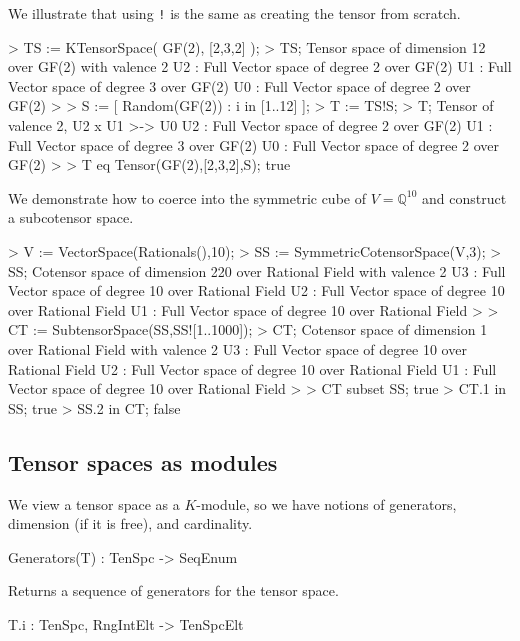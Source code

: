 \begin{example}[TenCoerce]
We illustrate that using {\tt !} is the same as creating the tensor from scratch.

\begin{code}
> TS := KTensorSpace( GF(2), [2,3,2] );
> TS;
Tensor space of dimension 12 over GF(2) with valence 2
U2 : Full Vector space of degree 2 over GF(2)
U1 : Full Vector space of degree 3 over GF(2)
U0 : Full Vector space of degree 2 over GF(2)
> 
> S := [ Random(GF(2)) : i in [1..12] ];
> T := TS!S;
> T;
Tensor of valence 2, U2 x U1 >-> U0
U2 : Full Vector space of degree 2 over GF(2)
U1 : Full Vector space of degree 3 over GF(2)
U0 : Full Vector space of degree 2 over GF(2)
> 
> T eq Tensor(GF(2),[2,3,2],S);
true
\end{code}

We demonstrate how to coerce into the symmetric cube of $V=\mathbb{Q}^{10}$ and construct a subcotensor space.

\begin{code}
> V := VectorSpace(Rationals(),10);
> SS := SymmetricCotensorSpace(V,3);
> SS;
Cotensor space of dimension 220 over Rational Field with valence 2
U3 : Full Vector space of degree 10 over Rational Field
U2 : Full Vector space of degree 10 over Rational Field
U1 : Full Vector space of degree 10 over Rational Field
> 
> CT := SubtensorSpace(SS,SS![1..1000]);
> CT;
Cotensor space of dimension 1 over Rational Field with valence 2
U3 : Full Vector space of degree 10 over Rational Field
U2 : Full Vector space of degree 10 over Rational Field
U1 : Full Vector space of degree 10 over Rational Field
> 
> CT subset SS;
true
> CT.1 in SS;
true
> SS.2 in CT;
false
\end{code}
\end{example}

\subsection{Tensor spaces as modules}

We view a tensor space as a $K$-module, so we have notions of generators, 
dimension (if it is free), and cardinality.

\begin{intrinsics}
Generators(T) : TenSpc -> SeqEnum
\end{intrinsics}

Returns a sequence of generators for the tensor space. 

\begin{intrinsics}
T.i : TenSpc, RngIntElt -> TenSpcElt
\end{intrinsics}

